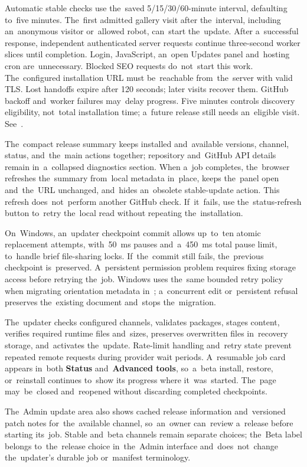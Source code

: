 \documentclass[11pt,a4paper]{article}
\newcommand{\filepath}[1]{\path{#1}}
\newcommand{\ui}[1]{\textbf{#1}}
\begin{document}
Automatic stable checks use the~saved 5/15/30/60-minute interval, defaulting
to~five minutes. The~first admitted gallery visit after the~interval, including
an~anonymous visitor or~allowed robot, can~start the~update. After a~successful
response, independent authenticated server requests continue three-second
worker slices until completion. Login, JavaScript, an~open Updates panel
and~hosting cron are~unnecessary. Blocked SEO requests do~not~start this work.
The~configured installation URL must be~reachable from~the~server with valid
TLS. Lost handoffs expire after 120 seconds; later visits recover them.
GitHub backoff and~worker failures may~delay progress. Five minutes controls
discovery eligibility, not~total installation time; a~future release still
needs an~eligible visit. See~\filepath{docs/AUTOUPDATE.md}.

The~compact release summary keeps installed and~available versions, channel,
status, and~the~main actions together; repository and~GitHub API details remain
in~a~collapsed diagnostics section. When a~job completes, the~browser refreshes
the~summary from~local metadata in~place, keeps the~panel open and~the~URL
unchanged, and~hides an~obsolete stable-update action. This refresh
does~not~perform another GitHub check. If~it~fails, use the~status-refresh
button to~retry the~local read without repeating the~installation.

On~Windows, an~updater checkpoint commit allows up~to~ten atomic replacement
attempts, with~50~ms pauses and~a~450~ms total pause limit, to~handle brief
file-sharing locks. If~the~commit still fails, the~previous checkpoint
is~preserved. A~persistent permission problem requires fixing storage access
before retrying the~job. Windows uses the~same bounded retry policy when
migrating orientation metadata in~\filepath{gallery.json}; a~concurrent edit
or~persistent refusal preserves the~existing document and~stops the~migration.

The~updater checks configured channels, validates packages, stages content,
verifies required runtime files and~sizes, preserves overwritten files
in~recovery storage, and~activates the~update. Rate-limit handling and~retry
state prevent repeated remote requests during provider wait periods. A~resumable
job card appears in~both \ui{Status} and~\ui{Advanced tools}, so~a~beta install,
restore, or~reinstall continues to~show its progress where it~was~started.
The~page may~be~closed and~reopened without discarding completed checkpoints.

The~Admin update area also shows cached release information and~versioned patch
notes for~the~available channel, so~an~owner can~review a~release before
starting its~job. Stable and~beta channels remain separate choices; the~Beta
label belongs to~the~release choice in~the~Admin interface and~does~not~change
the~updater's durable job or~manifest terminology.
\end{document}
